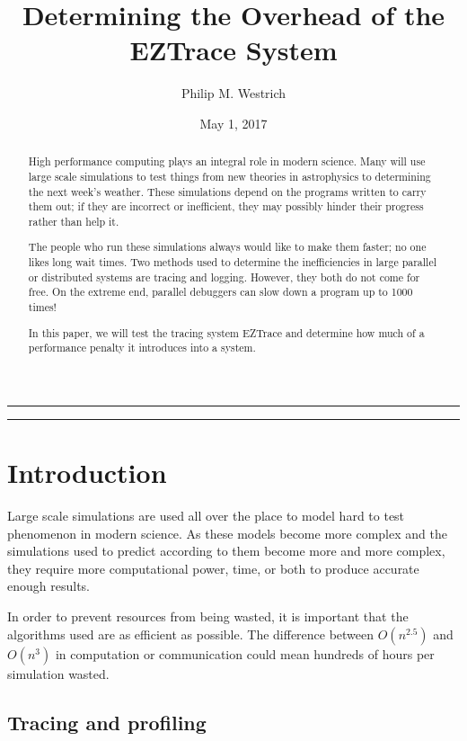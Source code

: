 \documentclass[12pt]{article}
\title{Determining the Overhead of the EZTrace System}
\author{Philip M. Westrich}
\date{May 1, 2017}
\begin{document}
\maketitle
\vspace{-0.3in}\noindent\rule{\linewidth}{0.4pt}
\doublespacing

\begin{abstract}

    High performance computing plays an integral role in modern science. Many will use large scale simulations to test 
    things from new theories in astrophysics to determining the next week's weather. These simulations depend on the 
    programs written to carry them out; if they are incorrect or inefficient, they may possibly hinder their progress 
    rather than help it.
    
    The people who run these simulations always would like to make them faster; no one likes long wait times. Two methods 
    used to determine the inefficiencies in large parallel or distributed systems are tracing and logging. However, they 
    both do not come for free. On the extreme end, parallel debuggers can slow down a program up to 1000 times!
    
    In this paper, we will test the tracing system EZTrace and determine how much of a performance penalty it introduces 
    into a system.\\
 
\end{abstract}

\vspace{-0.3in}\noindent\rule{\linewidth}{0.4pt}
\pagebreak

\section{Introduction}

Large scale simulations are used all over the place to model hard to test phenomenon in modern science. As these models 
become more complex and the simulations used to predict according to them become more and more complex, they require more 
computational power, time, or both to produce accurate enough results.

In order to prevent resources from being wasted, it is important that the algorithms used are as efficient as possible. 
The difference between $ O(n^{2.5}) $ and $ O(n^3) $ in computation or communication could mean hundreds of hours per 
simulation wasted.

\subsection{Tracing and profiling}
\end{document}

